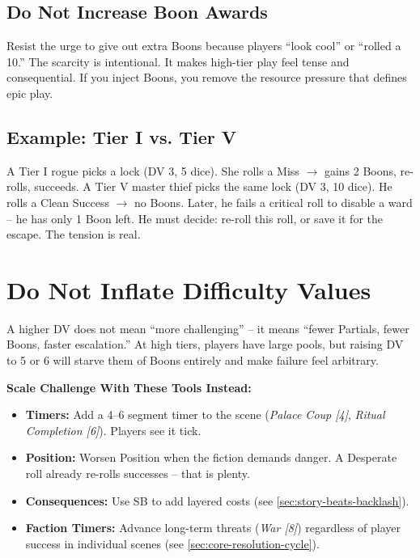 \subsection*{Do Not Increase Boon Awards}
Resist the urge to give out extra Boons because players ``look cool'' or ``rolled a 10.'' The scarcity is intentional. It makes high-tier play feel tense and consequential. If you inject Boons, you remove the resource pressure that defines epic play.

\subsection*{Example: Tier I vs. Tier V}
A Tier I rogue picks a lock (DV 3, 5 dice). She rolls a Miss $\rightarrow$ gains 2 Boons, re-rolls, succeeds.  
A Tier V master thief picks the same lock (DV 3, 10 dice). He rolls a Clean Success $\rightarrow$ no Boons. Later, he fails a critical roll to disable a ward -- he has only 1 Boon left. He must decide: re-roll this roll, or save it for the escape. The tension is real.

\section{Do Not Inflate Difficulty Values}

\begin{tcolorbox}[colback=red!5!white, colframe=red!75!black, title={Warning: DV Inflation Breaks High-Tier Play},breakable]
A higher DV does not mean ``more challenging'' -- it means ``fewer Partials, fewer Boons, faster escalation.'' At high tiers, players have large pools, but raising DV to 5 or 6 will starve them of Boons entirely and make failure feel arbitrary.

\medskip
\noindent\textbf{Scale Challenge With These Tools Instead:}
\begin{itemize}
  \item \textbf{Timers:} Add a 4--6 segment timer to the scene (\emph{Palace Coup [4]}, \emph{Ritual Completion [6]}). Players see it tick.
  \item \textbf{Position:} Worsen Position when the fiction demands danger. A Desperate roll already re-rolls successes -- that is plenty.
  \item \textbf{Consequences:} Use SB to add layered costs (see \ref{sec:story-beats-backlash}).
  \item \textbf{Faction Timers:} Advance long-term threats (\emph{War [8]}) regardless of player success in individual scenes (see \ref{sec:core-resolution-cycle}).
\end{itemize}
\end{tcolorbox}

